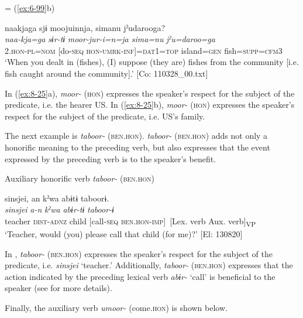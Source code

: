  = (\ref{ex:6-99}b)

{\TM}
\glll  naakjaga  sjɨ  moojuinnja,  simanu jˀudarooga?\\
\textit{naa-kja=ga}  \textit{sɨr-tɨ}  \textit{moor-jur-i=n=ja  sima=nu} \textit{jˀu=daroo=ga}\\
2.\textsc{hon}-\textsc{pl}=\textsc{nom}  [do-\textsc{seq}  \textsc{hon}-\textsc{umrk}-\textsc{inf}]=\textsc{dat1}=\textsc{top}  island=\textsc{gen} fish=\textsc{supp}=\textsc{cfm3}\\
\glt ‘When you dealt in (fishes), (I) suppose (they are) fishes from the community [i.e. fish caught around the community].’ [Co: 110328\_00.txt]
\z
\z

In (\ref{ex:8-25}a), \textit{moor-} (\textsc{hon}) expresses the speaker’s respect for the subject of the predicate, i.e. the hearer US. In (\ref{ex:8-25}b), \textit{moor-} (\textsc{hon}) expresses the speaker’s respect for the subject of the predicate, i.e. US’s family.

  The next example is \textit{taboor-} (\textsc{ben}.\textsc{hon}). \textit{taboor-} (\textsc{ben}.\textsc{hon}) adds not only a honorific meaning to the preceding verb, but also expresses that the event expressed by the preceding verb is to the speaker’s benefit.

\ea\label{ex:8-26}
  Auxiliary honorific verb \textit{taboor-} (\textsc{ben}.\textsc{hon})

  {\TM}
\glll  {\textbar}sinsjei{\textbar},  an  kˀwa  abɨtɨ  taboorɨ.\\
\textit{sinsjei}  \textit{a-n}  \textit{kˀwa}  \textit{abɨr-tɨ}  \textit{taboor-ɨ}\\
teacher  \textsc{dist}-\textsc{adnz}  child  [call-\textsc{seq}  \textsc{ben}.\textsc{hon}-\textsc{imp}]\
          {}[Lex. verb  Aux. verb]\textsubscript{VP}\\
\glt ‘Teacher, would (you) please call that child (for me)?’ [El: 130820]

In , \textit{taboor-} (\textsc{ben}.\textsc{hon}) expresses the speaker’s respect for the subject of the predicate, i.e. \textit{sinsjei} ‘teacher.’ Additionally, \textit{taboor-} (\textsc{ben}.\textsc{hon}) expresses that the action indicated by the preceding lexical verb \textit{abɨr-} ‘call’ is beneficial to the speaker (see  for more details).

  Finally, the auxiliary verb \textit{umoor-} (come.\textsc{hon}) is shown below.

